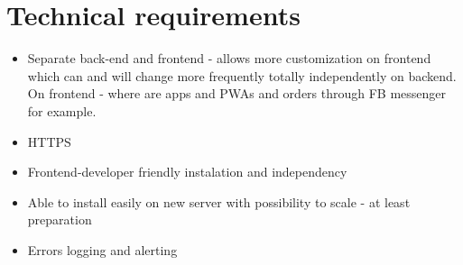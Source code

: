 \section{Technical requirements}
\begin{itemize}
	\item Separate back-end and frontend - allows more customization on frontend which can and will change more frequently totally independently on backend. On frontend - where are apps and PWAs and orders through FB messenger for example.
	\item HTTPS
	\item Frontend-developer friendly instalation and independency
	\item Able to install easily on new server with possibility to scale - at least preparation
	\item Errors logging and alerting
\end{itemize}
